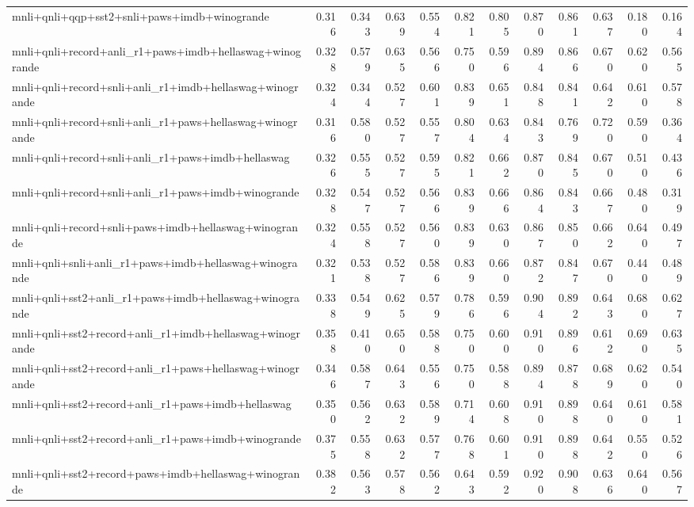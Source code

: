 \begin{table}[t]
\begin{tabular}{lrrrrrrrrrrr}
    mnli+qnli+qqp+sst2+snli+paws+imdb+winogrande & 0.316 & 0.343 & 0.639 & 0.554 & 0.821 & 0.805 & 0.870 & 0.861 & 0.637 & 0.180 & 0.164 \\
    mnli+qnli+record+anli\_r1+paws+imdb+hellaswag+winogrande & 0.328 & 0.579 & 0.635 & 0.566 & 0.750 & 0.596 & 0.894 & 0.866 & 0.670 & 0.620 & 0.565 \\
    mnli+qnli+record+snli+anli\_r1+imdb+hellaswag+winogrande & 0.324 & 0.344 & 0.527 & 0.601 & 0.839 & 0.651 & 0.848 & 0.841 & 0.642 & 0.610 & 0.578 \\
    mnli+qnli+record+snli+anli\_r1+paws+hellaswag+winogrande & 0.316 & 0.580 & 0.527 & 0.557 & 0.804 & 0.634 & 0.843 & 0.769 & 0.720 & 0.590 & 0.364 \\
    mnli+qnli+record+snli+anli\_r1+paws+imdb+hellaswag & 0.326 & 0.555 & 0.527 & 0.595 & 0.821 & 0.662 & 0.870 & 0.845 & 0.670 & 0.510 & 0.436 \\
    mnli+qnli+record+snli+anli\_r1+paws+imdb+winogrande & 0.328 & 0.547 & 0.527 & 0.566 & 0.839 & 0.666 & 0.864 & 0.843 & 0.667 & 0.480 & 0.319 \\
    mnli+qnli+record+snli+paws+imdb+hellaswag+winogrande & 0.324 & 0.558 & 0.527 & 0.560 & 0.839 & 0.630 & 0.867 & 0.850 & 0.662 & 0.640 & 0.497 \\
    mnli+qnli+snli+anli\_r1+paws+imdb+hellaswag+winogrande & 0.321 & 0.538 & 0.527 & 0.586 & 0.839 & 0.660 & 0.872 & 0.847 & 0.670 & 0.440 & 0.489 \\
    mnli+qnli+sst2+anli\_r1+paws+imdb+hellaswag+winogrande & 0.338 & 0.549 & 0.625 & 0.579 & 0.786 & 0.596 & 0.904 & 0.892 & 0.643 & 0.680 & 0.627 \\
    mnli+qnli+sst2+record+anli\_r1+imdb+hellaswag+winogrande & 0.358 & 0.410 & 0.650 & 0.588 & 0.750 & 0.600 & 0.910 & 0.896 & 0.612 & 0.690 & 0.635 \\
    mnli+qnli+sst2+record+anli\_r1+paws+hellaswag+winogrande & 0.346 & 0.587 & 0.643 & 0.556 & 0.750 & 0.588 & 0.894 & 0.878 & 0.689 & 0.620 & 0.540 \\
    mnli+qnli+sst2+record+anli\_r1+paws+imdb+hellaswag & 0.350 & 0.562 & 0.632 & 0.589 & 0.714 & 0.608 & 0.910 & 0.898 & 0.640 & 0.610 & 0.581 \\
    mnli+qnli+sst2+record+anli\_r1+paws+imdb+winogrande & 0.375 & 0.558 & 0.632 & 0.577 & 0.768 & 0.601 & 0.910 & 0.898 & 0.642 & 0.550 & 0.526 \\
    mnli+qnli+sst2+record+paws+imdb+hellaswag+winogrande & 0.382 & 0.563 & 0.578 & 0.562 & 0.643 & 0.592 & 0.920 & 0.908 & 0.636 & 0.640 & 0.567 \\

\end{tabular}
\end{table}
